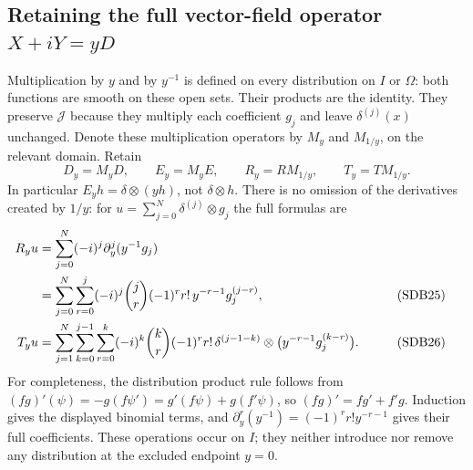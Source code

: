 \subsection{Retaining the full vector-field operator \texorpdfstring{$X+iY=yD$}{X+iY=yD}}

Multiplication by $y$ and by $y^{-1}$ is defined on every distribution
on $I$ or $\Omega$: both functions are smooth on these open sets.
Their products are the identity. They preserve $\mathcal J$ because
they multiply each coefficient $g_j$ and leave $\delta^{(j)}(x)$
unchanged. Denote these multiplication operators by $M_y$ and
$M_{1/y}$, on the relevant domain. Retain
\begin{equation}\tag{SDB24}\label{eq:SDB-ydefinitions}
 D_y=M_yD,\qquad E_y=M_yE,\qquad
 R_y=R M_{1/y},\qquad T_y=T M_{1/y}.
\end{equation}
In particular $E_yh=\delta\otimes(yh)$, not $\delta\otimes h$.
There is no omission of the derivatives created by $1/y$: for
$u=\sum_{j=0}^N\delta^{(j)}\otimes g_j$ the full formulas are
\begin{align}
 R_yu
 &=\sum_{j=0}^N(-i)^j\partial_y^j(y^{-1}g_j)\notag\\
 &=\sum_{j=0}^N\sum_{r=0}^j
     (-i)^j\binom{j}{r}(-1)^r r!\,
          y^{-r-1}g_j^{(j-r)},
       &&\tag{SDB25}\label{eq:SDB-yresidue}\\
 T_yu
 &=\sum_{j=1}^N\sum_{k=0}^{j-1}\sum_{r=0}^k
    (-i)^k\binom{k}{r}(-1)^r r!\,
       \delta^{(j-1-k)}\otimes
                 \bigl(y^{-r-1}g_j^{(k-r)}\bigr).
       &&\tag{SDB26}\label{eq:SDB-yhomotopy}
\end{align}
For completeness, the distribution product rule follows from
$(fg)'(\psi)=-g(f\psi')=g'(f\psi)+g(f'\psi)$, so
$(fg)'=fg'+f'g$. Induction gives the displayed binomial terms, and
$\partial_y^r(y^{-1})=(-1)^r r!y^{-r-1}$ gives their full
coefficients. These operations occur on $I$; they neither introduce
nor remove any distribution at the excluded endpoint $y=0$.

